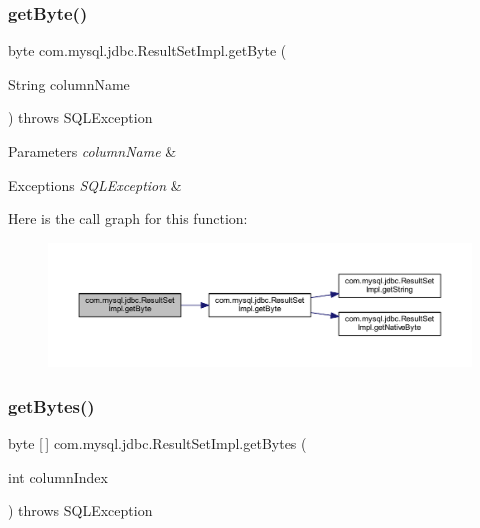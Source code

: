 \subsubsection{\texorpdfstring{get\+Byte()}{getByte()}\hspace{0.1cm}{\footnotesize\ttfamily [2/2]}}
{\footnotesize\ttfamily byte com.\+mysql.\+jdbc.\+Result\+Set\+Impl.\+get\+Byte (\begin{DoxyParamCaption}\item[{String}]{column\+Name }\end{DoxyParamCaption}) throws S\+Q\+L\+Exception}


\begin{DoxyParams}{Parameters}
{\em column\+Name} & \\
\hline
\end{DoxyParams}

\begin{DoxyExceptions}{Exceptions}
{\em S\+Q\+L\+Exception} & \\
\hline
\end{DoxyExceptions}
Here is the call graph for this function\+:
\nopagebreak
\begin{figure}[H]
\begin{center}
\leavevmode
\includegraphics[width=350pt]{classcom_1_1mysql_1_1jdbc_1_1_result_set_impl_a026c2532a7205235f2f6bc3537f6add6_cgraph}
\end{center}
\end{figure}
\mbox{\label{classcom_1_1mysql_1_1jdbc_1_1_result_set_impl_a128a017a783b29ee921fe5ad959136fe}} 
\subsubsection{\texorpdfstring{get\+Bytes()}{getBytes()}\hspace{0.1cm}{\footnotesize\ttfamily [1/2]}}
{\footnotesize\ttfamily byte \mbox{[}$\,$\mbox{]} com.\+mysql.\+jdbc.\+Result\+Set\+Impl.\+get\+Bytes (\begin{DoxyParamCaption}\item[{int}]{column\+Index }\end{DoxyParamCaption}) throws S\+Q\+L\+Exception}


